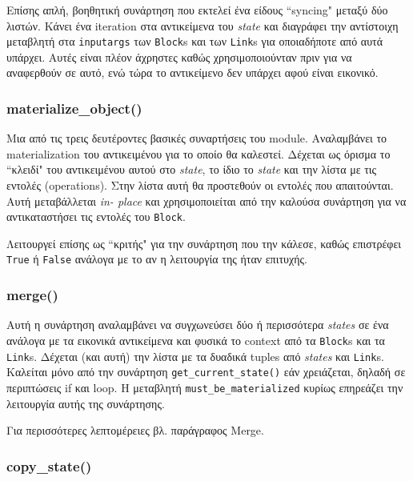 Επίσης απλή, βοηθητική συνάρτηση που εκτελεί ένα είδους ``syncing" μεταξύ δύο
λιστών. Κάνει ένα iteration στα αντικείμενα του \textit{state} και διαγράφει την
αντίστοιχη μεταβλητή στα \texttt{inputargs} των \texttt{Block}s και των
\texttt{Link}s για οποιαδήποτε από αυτά υπάρχει. Αυτές είναι πλέον άχρηστες
καθώς χρησιμοποιούνταν πριν για να αναφερθούν σε αυτό, ενώ τώρα το αντικείμενο
δεν υπάρχει αφού είναι εικονικό.

\subsubsection{materialize\_object()}

Μια από τις τρεις δευτέροντες βασικές συναρτήσεις του module. Αναλαμβάνει το
materialization του αντικειμένου για το οποίο θα καλεστεί. Δέχεται ως όρισμα το
``κλειδί" του αντικειμένου αυτού στο \textit{state}, το ίδιο το \textit{state}
και την λίστα με τις εντολές (operations). Στην λίστα αυτή θα προστεθούν οι
εντολές που απαιτούνται. Αυτή μεταβάλλεται \textit{in- place} και
χρησιμοποιείται από την καλούσα συνάρτηση για να αντικαταστήσει τις εντολές του
\texttt{Block}.

Λειτουργεί επίσης ως ``κριτής" για την συνάρτηση που την κάλεσε, καθώς
επιστρέφει \texttt{True} ή \texttt{False} ανάλογα με το αν η λειτουργία της ήταν
επιτυχής.

\subsubsection{merge()}

Αυτή η συνάρτηση αναλαμβάνει να συγχωνεύσει δύο ή περισσότερα \textit{states} σε
ένα ανάλογα με τα εικονικά αντικείμενα και φυσικά το context από τα
\texttt{Block}s και τα \texttt{Link}s. Δέχεται (και αυτή) την λίστα με τα
δυαδικά tuples από \textit{states} και \texttt{Link}s. Καλείται μόνο από την
συνάρτηση \texttt{get\_current\_state()} εάν χρειάζεται, δηλαδή σε περιπτώσεις
if και loop. Η μεταβλητή \texttt{must\_be\_materialized} κυρίως επηρεάζει την
λειτουργία αυτής της συνάρτησης.

Για περισσότερες λεπτομέρειες βλ. παράγραφος Merge.

\subsubsection{copy\_state()}


